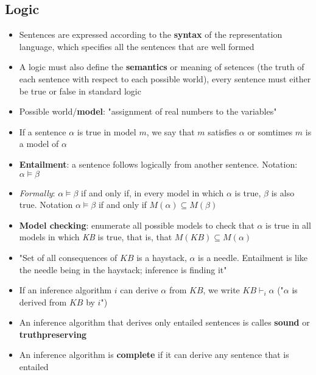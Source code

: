 \documentclass{scrartcl}
\begin{document}
\subsection{Logic} 
\begin{itemize}
    \item 
        Sentences are expressed according to the \textbf{syntax} of the representation language, which specifies all the sentences that are well formed
    \item
        A logic must also define the \textbf{semantics} or meaning of setences (the truth of each sentence with respect to each possible world), every sentence must either be true or false in standard logic
    \item
        Possible world/\textbf{model}: "assignment of real numbers to the variables"
    \item
        If a sentence $\alpha$ is true in model $m$, we say that $m$ satisfies $\alpha$ or somtimes $m$ is a model of $\alpha$
    \item
        \textbf{Entailment}: a sentence follows logically from another sentence. Notation: $\alpha \vDash \beta$
    \item
        \textit{Formally}: $\alpha \vDash \beta$ if and only if, in every model in which $\alpha$ is true, $\beta$ is also true. Notation $\alpha \vDash \beta$ if and only if $M(\alpha) \subseteq M(\beta)$
    \item
        \textbf{Model checking}: enumerate all possible models to check that $\alpha$ is true in all models in which \textit{KB} is true, that is, that $M(KB) \subseteq M(\alpha)$
    \item
        "Set of all consequences of $KB$ is a haystack, $\alpha$ is a needle. Entailment is like the needle being in the haystack; inference is finding it"
    \item
        If an inference algorithm $i$ can derive $\alpha$ from $KB$, we write $KB \vdash_{i} \alpha$ ("$\alpha$ is derived from $KB$ by $i$")
    \item
        An inference algorithm that derives only entailed sentences is calles \textbf{sound} or \textbf{truthpreserving}
    \item
        An inference algorithm is \textbf{complete} if it can derive any sentence that is entailed
\end{itemize}
\end{document}
